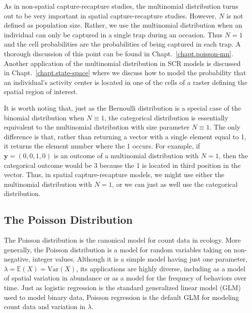 As in non-spatial capture-recapture studies, the multinomial
distribution turns out to be very important in spatial
capture-recapture studies. However, $N$ is not defined as population
size. Rather, we use the multinomial distribution when an individual
can only be captured in a single trap during an occasion. Thus
$N=1$ and the cell probabilities are the probabilities of
being captured in each trap. A thorough discussion of this point can
be found in Chapt.~\ref{chapt.poisson-mn}. Another application of the
multinomial distribution in SCR models is discussed in
Chapt.~\ref{chapt.state-space} where we discuss how to model the
probability that an individual's activity center is located in one of
the cells of a raster defining the spatial region of interest.

It is worth noting that, just as the Bernoulli distribution is a
special case of the binomial distribution when $N \equiv 1$, the
categorical distribution is essentially equivalent to
the multinomial distribution with size parameter
$N\equiv1$. The only difference is that, rather than returning a
vector with a single element equal to 1, it returns the element number
where the 1 occurs. For example, if $\mathbf{y}=(0,0,1,0)$ is an outcome of a
multinomial distribution with $N=1$, then the categorical outcome
would be 3 because the 1 is located in third position in the vector. Thus, in spatial
capture-recapture models, we might use either the multinomial
distribution with $N=1$, or we can just as well use the categorical
distribution. %


\subsection{The Poisson Distribution}




The Poisson distribution is the canonical model for count data in
ecology.  More generally, the
Poisson distribution is a model for random variables taking on
non-negative, integer values.  Although it is a simple model having just one
parameter, $\lambda = \mathbb{E}(X) = \text{Var}(X)$, its applications
are highly diverse, including
as a model of spatial variation in abundance or as a model for the
frequncy of behaviors over time.  Just as logistic regression is the
standard generalized linear model (GLM) used to model binary data, Poisson
regression is the default GLM for modeling count data and variation in
$\lambda$.

